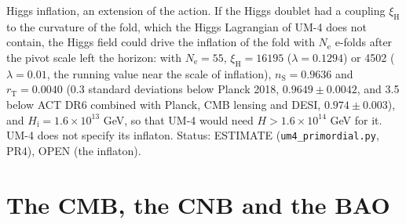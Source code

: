 \documentclass[
  10pt,
]{article}
\begin{document}
Higgs inflation, an extension of the action. If the Higgs doublet had a
coupling \(\xi_{\mathrm{H}}\) to the curvature of the fold, which the
Higgs Lagrangian of UM-4 does not contain, the Higgs field could drive
the inflation of the fold with \(N_{\mathrm{e}}\) e-folds after the
pivot scale left the horizon: with \(N_{\mathrm{e}} = 55\),
\(\xi_{\mathrm{H}} = 16195\) (\(\lambda = 0.1294\)) or 4502
(\(\lambda = 0.01\), the running value near the scale of inflation),
\(n_{\mathrm{S}} = 0.9636\) and \(r_{\mathrm{T}} = 0.0040\) (\(0.3\)
standard deviations below Planck 2018, \(0.9649 \pm 0.0042\), and 3.5
below ACT DR6 combined with Planck, CMB lensing and DESI,
\(0.974 \pm 0.003\)), and \(H_{\mathrm{i}} = 1.6\times10^{13}\) GeV, so
that UM-4 would need \(H > 1.6\times10^{14}\) GeV for it. UM-4 does not
specify its inflaton. Status: ESTIMATE (\texttt{um4\_primordial.py},
PR4), OPEN (the inflaton).

\hypertarget{the-cmb-the-cnb-and-the-bao}{%
\section{The CMB, the CNB and the
BAO}\label{the-cmb-the-cnb-and-the-bao}}
\end{document}
